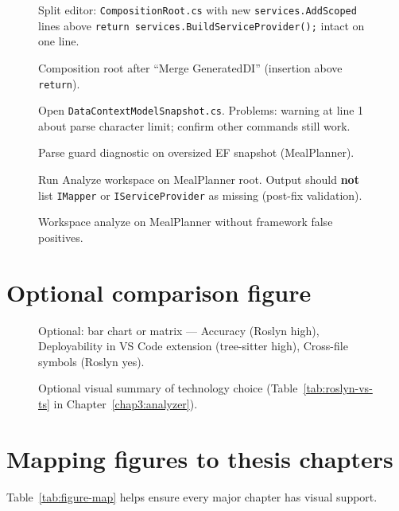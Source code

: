 \begin{figure}[htbp]
\centering
{}%
{Split editor: \texttt{CompositionRoot.cs} with new \texttt{services.AddScoped} lines above \texttt{return services.BuildServiceProvider();} intact on one line.}
\caption{Composition root after ``Merge GeneratedDI'' (insertion above \texttt{return}).}
\label{fig:merge-result}
\end{figure}

\begin{figure}[htbp]
\centering
{}%
{Open \texttt{DataContextModelSnapshot.cs}. Problems: warning at line 1 about parse character limit; confirm other commands still work.}
\caption{Parse guard diagnostic on oversized EF snapshot (MealPlanner).}
\label{fig:mealplanner-parse-limit}
\end{figure}

\begin{figure}[htbp]
\centering
{}%
{Run Analyze workspace on MealPlanner root. Output should \textbf{not} list \texttt{IMapper} or \texttt{IServiceProvider} as missing (post-fix validation).}
\caption{Workspace analyze on MealPlanner without framework false positives.}
\label{fig:mealplanner-analyze}
\end{figure}

\section{Optional comparison figure}

\begin{figure}[htbp]
\centering
{}%
{Optional: bar chart or matrix --- Accuracy (Roslyn high), Deployability in VS Code extension (tree-sitter high), Cross-file symbols (Roslyn yes).}
\caption{Optional visual summary of technology choice (Table~\ref{tab:roslyn-vs-ts} in Chapter~\ref{chap3:analyzer}).}
\label{fig:roslyn-comparison}
\end{figure}

\section{Mapping figures to thesis chapters}

Table~\ref{tab:figure-map} helps ensure every major chapter has visual support.

